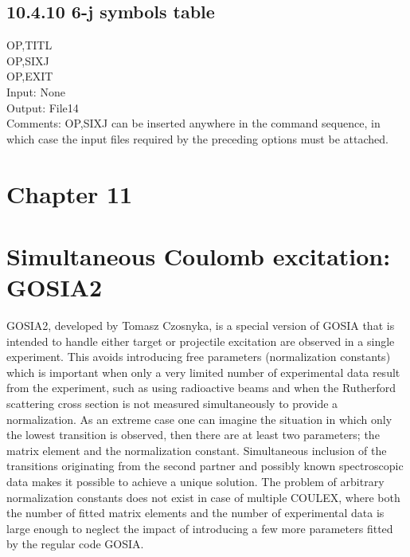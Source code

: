 \documentclass[10pt]{article}
\begin{document}
\subsection*{10.4.10 6-j symbols table}
OP,TITL\\
OP,SIXJ\\
OP,EXIT\\
Input: None\\
Output: File14\\
Comments: OP,SIXJ can be inserted anywhere in the command sequence, in which case the input files required by the preceding options must be attached.

\section*{Chapter 11}
\section*{Simultaneous Coulomb excitation: GOSIA2 }
GOSIA2, developed by Tomasz Czosnyka, is a special version of GOSIA that is intended to handle either target or projectile excitation are observed in a single experiment. This avoids introducing free parameters (normalization constants) which is important when only a very limited number of experimental data result from the experiment, such as using radioactive beams and when the Rutherford scattering cross section is not measured simultaneously to provide a normalization. As an extreme case one can imagine the situation in which only the lowest transition is observed, then there are at least two parameters; the matrix element and the normalization constant. Simultaneous inclusion of the transitions originating from the second partner and possibly known spectroscopic data makes it possible to achieve a unique solution. The problem of arbitrary normalization constants does not exist in case of multiple COULEX, where both the number of fitted matrix elements and the number of experimental data is large enough to neglect the impact of introducing a few more parameters fitted by the regular code GOSIA.
\end{document}

